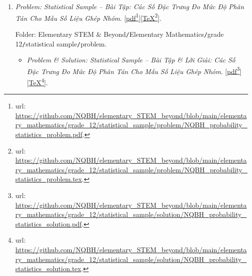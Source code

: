 \documentclass[12pt,twoside]{book}
\begin{document}
\begin{enumerate}
	Folder: {\sf Elementary STEM \& Beyond{\tt/}Elementary Mathematics{\tt/}grade 12{\tt/}3D vector{\tt/}problem}.
	\begin{itemize}
		\item {\it Problem \& Solution: Coordinates of Vectors in 3D Space -- Bài Tập \& Lời Giải: Tọa Độ Của Vector Trong Không Gian}. [\href{https://github.com/NQBH/elementary_STEM_beyond/blob/main/elementary_mathematics/grade_12/3D_vector/solution/NQBH_3D_vector_solution.pdf}{pdf}\footnote{{\sc url}: \url{https://github.com/NQBH/elementary_STEM_beyond/blob/main/elementary_mathematics/grade_12/3D_vector/solution/NQBH_3D_vector_solution.pdf}.}][\href{https://github.com/NQBH/elementary_STEM_beyond/blob/main/elementary_mathematics/grade_12/3D_vector/solution/NQBH_3D_vector_solution.tex}{\TeX}\footnote{{\sc url}: \url{https://github.com/NQBH/elementary_STEM_beyond/blob/main/elementary_mathematics/grade_12/3D_vector/solution/NQBH_3D_vector_solution.tex}.}].
		
		Folder: {\sf Elementary STEM \& Beyond{\tt/}Elementary Mathematics{\tt/}grade 12{\tt/}3D vector {\tt/}solution}.
	\end{itemize}
	\item {\it Problem: Statistical Sample -- Bài Tập: Các Số Đặc Trưng Đo Mức Độ Phân Tán Cho Mẫu Số Liệu Ghép Nhóm}. [\href{https://github.com/NQBH/elementary_STEM_beyond/blob/main/elementary_mathematics/grade_12/statistical_sample/problem/NQBH_probability_statistics_problem.pdf}{pdf}\footnote{{\sc url}: \url{https://github.com/NQBH/elementary_STEM_beyond/blob/main/elementary_mathematics/grade_12/statistical_sample/problem/NQBH_probability_statistics_problem.pdf}.}][\href{https://github.com/NQBH/elementary_STEM_beyond/blob/main/elementary_mathematics/grade_12/statistical_sample/problem/NQBH_probability_statistics_problem.tex}{\TeX}\footnote{{\sc url}: \url{https://github.com/NQBH/elementary_STEM_beyond/blob/main/elementary_mathematics/grade_12/statistical_sample/problem/NQBH_probability_statistics_problem.tex}.}].
	
	Folder: {\sf Elementary STEM \& Beyond{\tt/}Elementary Mathematics{\tt/}grade 12{\tt/}statistical sample{\tt/}problem}.
	\begin{itemize}
		\item {\it Problem \& Solution: Statistical Sample -- Bài Tập \& Lời Giải: Các Số Đặc Trưng Đo Mức Độ Phân Tán Cho Mẫu Số Liệu Ghép Nhóm}. [\href{https://github.com/NQBH/elementary_STEM_beyond/blob/main/elementary_mathematics/grade_12/statistical_sample/solution/NQBH_probability_statistics_solution.pdf}{pdf}\footnote{{\sc url}: \url{https://github.com/NQBH/elementary_STEM_beyond/blob/main/elementary_mathematics/grade_12/statistical_sample/solution/NQBH_probability_statistics_solution.pdf}.}][\href{https://github.com/NQBH/elementary_STEM_beyond/blob/main/elementary_mathematics/grade_12/statistical_sample/solution/NQBH_probability_statistics_solution.tex}{\TeX}\footnote{{\sc url}: \url{https://github.com/NQBH/elementary_STEM_beyond/blob/main/elementary_mathematics/grade_12/statistical_sample/solution/NQBH_probability_statistics_solution.tex}.}].
		

\end{itemize}
\end{enumerate}
\end{document}
